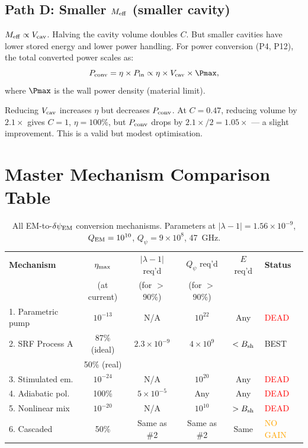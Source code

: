 \documentclass[11pt]{article}
\newcommand{\ee}[1]{\times 10^{#1}}
\newcommand{\dpsiEM}{\delta\psi_{\rm EM}}
\newcommand{\Meff}{M_{\rm eff}}
\newcommand{\lambdaone}{|\lambda{-}1|}
\newcommand{\Qpsi}{Q_\psi}
\newcommand{\QEM}{Q_{\rm EM}}
\begin{document}
\subsection{Path D: Smaller $\Meff$ (smaller cavity)}

$\Meff \propto V_{\rm cav}$. Halving the cavity volume doubles $C$.
But smaller cavities have lower stored energy and lower power handling.
For power conversion (P4, P12), the total converted power scales as:
\begin{equation}
P_{\rm conv} = \eta \times P_{\rm in} \propto \eta \times V_{\rm cav}
\times \Pmax,
\end{equation}
where $\Pmax$ is the wall power density (material limit).

Reducing $V_{\rm cav}$ increases $\eta$ but decreases $P_{\rm conv}$.
At $C = 0.47$, reducing volume by $2.1\times$ gives $C = 1$,
$\eta = 100\%$, but $P_{\rm conv}$ drops by $2.1\times/2 = 1.05\times$
--- a slight improvement. This is a valid but modest optimisation.

\section{Master Mechanism Comparison Table}
\label{sec:master-table}

\begin{table}[H]
\centering
\caption{All EM-to-$\dpsiEM$ conversion mechanisms. Parameters at
$\lambdaone = 1.56\ee{-9}$, $\QEM = 10^{10}$, $\Qpsi = 9\ee{8}$,
47~GHz.}
\label{tab:master-mechanisms}
\begin{tabular}{@{}p{3cm}ccccl@{}}
\toprule
\textbf{Mechanism} & $\eta_{\rm max}$ & $\lambdaone$ req'd
  & $\Qpsi$ req'd & $E$ req'd & \textbf{Status} \\
  & (at current) & (for $>$90\%) & (for $>$90\%) & & \\
\midrule
1. Parametric pump & $10^{-13}$ & N/A & $10^{22}$ & Any
  & \textcolor{red}{DEAD} \\[4pt]
2. SRF Process A & 87\% (ideal) & $2.3\ee{-9}$ & $4\ee{9}$ & $<B_{\rm sh}$
  & \textcolor{green!50!black}{BEST} \\
  & 50\% (real) & & & & \\[4pt]
3. Stimulated em. & $10^{-24}$ & N/A & $10^{20}$ & Any
  & \textcolor{red}{DEAD} \\[4pt]
4. Adiabatic pol. & 100\% & $5\ee{-5}$ & Any & Any
  & \textcolor{red}{DEAD} \\[4pt]
5. Nonlinear mix & $10^{-20}$ & N/A & $10^{10}$ & $>B_{\rm sh}$
  & \textcolor{red}{DEAD} \\[4pt]
6. Cascaded & 50\% & Same as \#2 & Same as \#2 & Same
  & \textcolor{orange}{NO GAIN} \\
\bottomrule
\end{tabular}
\end{table}
\end{document}
